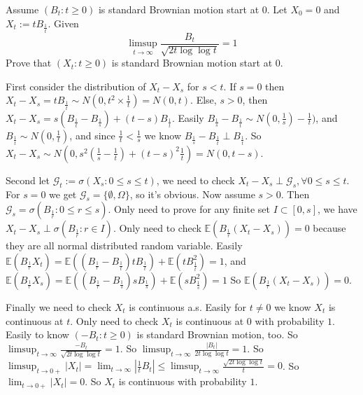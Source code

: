 \documentclass[../main]{subfiles}
\begin{document}
\begin{problem}\label{pro:4}
  Assume \((B_t:t \geq 0)\) is standard Brownian motion start at \(0\).
  Let \(X_0=0\) and \(X_t:=t B_{\frac{1}{t}}\).
  Given
  \[
    \limsup_{t \to \infty}\frac{B_{t}}{\sqrt{2t \log \log t}}=1
  \]
  Prove that \((X_t:t \geq 0)\) is standard Brownian motion start at \(0\).
\end{problem}
\begin{solution}
  First consider the distribution of \(X_t-X_s\) for \(s <t\).
  If \(s=0\) then \(X_t-X_s=t B_{\frac{1}{t}} \sim N(0,t^2 \times \frac{1}{t})=N(0,t)\).
  Else, \(s >0\), then \(X_t-X_s =s(B_{\frac{1}{t}}-B_{\frac{1}{s}})+(t-s)B_{\frac{1}{t}}\).
  Easily \(B_{\frac{1}{s}}-B_{\frac{1}{t}} \sim N(0,\frac{1}{s})-\frac{1}{t})\),
  and \(B_{\frac{1}{t}} \sim N(0,\frac{1}{t})\), and since \(\frac{1}{t}<\frac{1}{s}\) we know
  \(B_{\frac{1}{s}}-B_{\frac{1}{t}}\perp B_{\frac{1}{t}}\).
  So \(X_t-X_s \sim N(0,s^2(\frac{1}{s}-\frac{1}{t})+(t-s)^2 \frac{1}{t})=N(0,t-s)\).

  Second let \(\mathcal{G}_t:=\sigma(X_s:0 \leq s \leq t)\),
  we need to check \(X_t-X_s \perp \mathcal{G}_s,\forall 0 \leq s \leq t\).
  For \(s=0\) we get \(\mathcal{G}_s=\{\emptyset,\Omega\}\), so it's obvious.
  Now assume \(s>0\). Then \(\mathcal{G}_s=\sigma(B_{\frac{1}{r}}:0 \leq r \leq s)\).
  Only need to prove for any finite set \(I \subset [0,s]\), we have \(X_t-X_s \perp \sigma(B_{\frac{1}{r}}:r \in I)\).
  Only need to check \(\mathbb{E}(B_{\frac{1}{r}}(X_t-X_s))=0\) because they are all normal distributed random variable.
  Easily \(\mathbb{E}(B_{\frac{1}{r}}X_t)=\mathbb{E}((B_{\frac{1}{r}}-B_{\frac{1}{t}})tB_{\frac{1}{t}})+\mathbb{E}(t B_{\frac{1}{t}}^2)=1\),
  and \(\mathbb{E}(B_{\frac{1}{r}}X_s)=\mathbb{E}((B_{\frac{1}{r}}-B_{\frac{1}{s}})sB_{\frac{1}{s}})+\mathbb{E}(s B_{\frac{1}{s}}^2)=1\)
  So \(\mathbb{E}(B_{\frac{1}{r}}(X_t-X_s))=0\).

  Finally we need to check \(X_t\) is continuous a.s.
  Easily for \(t \neq 0\) we know \(X_t\) is continuous at \(t\).
  Only need to check \(X_t\) is continuous at \(0\) with probability \(1\).
  Easily to know \((-B_t:t \geq 0)\) is standard Brownian motion, too.
  So \(\limsup_{t \to \infty}\frac{-B_t}{\sqrt{2t \log \log t}}=1\).
  So \(\limsup_{t \to \infty}\frac{|B_t|}{2t \log \log t}=1\).
  So \(\limsup_{t \to 0+}|X_t|=\lim_{t \to \infty} |\frac{1}{t}B_{t}| \leq \limsup_{t \to \infty}\frac{\sqrt{2 t \log \log t}}{t}=0\).
  So \(\lim_{t \to 0+}|X_t|=0\).
  So \(X_t\) is continuous with probability \(1\).
\end{solution}
\end{document}
